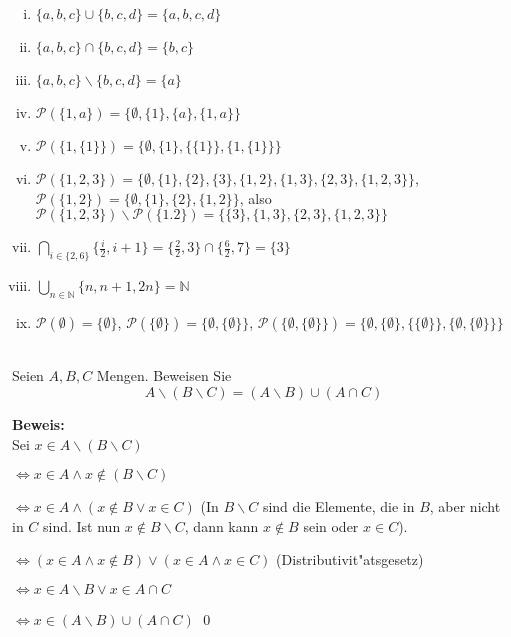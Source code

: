  \begin{loesung}
\begin{enumerate}[(i)]
\item $\{a,b,c\}\cup \{b,c,d\}=\{a,b,c,d\}$
\item $\{a,b,c\}\cap \{b,c,d\}=\{b,c\}$
\item $\{a,b,c\}\backslash \{b,c,d\}=\{a\}$
\item $\mathscr{P}(\{1,a\})=\{\emptyset,\{1\},\{a\},\{1,a\}\}$
\item $\mathscr{P}(\{1,\{1\}\})=\{\emptyset,\{1\},\{\{1\}\},\{1,\{1\}\}\}$
\item $\mathscr{P}(\{1,2,3\})=\{\emptyset,\{1\},\{2\},\{3\},\{1,2\},\{1,3\},\{2,3\},\{1,2,3\}\}$, $\mathscr{P}(\{1,2\})=\{\emptyset,\{1\},\{2\},\{1,2\}\}$, also $\mathscr{P}(\{1,2,3\})\backslash\mathscr{P}(\{1.2\})=\{\{3\},\{1,3\},\{2,3\},\{1,2,3\}\}$
\item $\bigcap_{i\in\{2,6\}}\{\frac{i}{2},i+1\}=\{\frac{2}{2},3\}\cap\{\frac{6}{2},7\}=\{3\}$
\item $\bigcup_{n\in\mathbb{N}}\{n,n+1,2n\}=\mathbb{N}$
\item $\mathscr{P}(\emptyset)=\{\emptyset\}$, $\mathscr{P}(\{\emptyset\})=\{\emptyset,\{\emptyset\}\}$, $\mathscr{P}(\{\emptyset,\{\emptyset\}\})=\{\emptyset,\{\emptyset\},\{\{\emptyset\}\}, \{\emptyset,\{\emptyset\}\}\}$
\end{enumerate}
 \end{loesung}
\\
Seien $A,B,C$ Mengen. Beweisen Sie 
\[A\backslash(B\backslash C)=(A\backslash B)\cup (A\cap C)\]
\begin{loesung}
\textbf{Beweis:}\\
Sei $x\in A\backslash(B\backslash C)$

$\Leftrightarrow x\in A\wedge x\notin (B\backslash C)$

$\Leftrightarrow x\in A\wedge (x\notin B\vee x\in C)$ (In $B\backslash C$ sind die Elemente, die in $B$, aber nicht in $C$ sind. Ist nun $x\notin B\backslash C$, dann kann $x\notin B$ sein oder $x\in C$).

$\Leftrightarrow (x\in A\wedge x\notin B) \vee (x\in A\wedge x\in C)$ (Distributivit"atsgesetz)

$\Leftrightarrow x\in A\backslash B\vee x\in A\cap C$

$\Leftrightarrow x\in (A\backslash B)\cup (A\cap C)$
\qed

\end{loesung}


